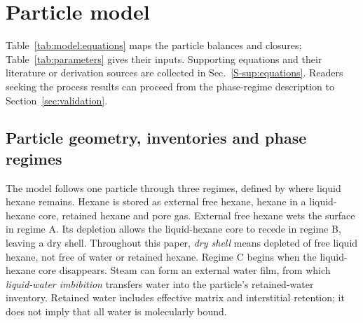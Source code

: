 \section{Particle model}
\label{sec:physical}
\label{sec:model}
\label{sec:thermo}

Table~\ref{tab:model:equations} maps the particle balances and closures;
Table~\ref{tab:parameters} gives their inputs. Supporting equations and
their literature or derivation sources are collected in
Sec.~\ref*{S-sup:equations}. Readers seeking the process results can proceed
from the phase-regime description to Section~\ref{sec:validation}.



\subsection{Particle geometry, inventories and phase regimes}
\label{sec:physical:regimes}
\label{sec:physical:threshold}
\label{sec:physical:inversion}
\label{sec:physical:lewis}

The model follows one particle through three regimes, defined by where
liquid hexane remains. Hexane is stored as external free hexane, hexane in a
liquid-hexane core, retained hexane and pore gas.
External free hexane wets the surface in regime A. Its depletion allows the
liquid-hexane core to recede in regime B, leaving a dry shell. Throughout
this paper, \emph{dry shell} means depleted of free liquid hexane, not free
of water or retained hexane. Regime C begins when the liquid-hexane core
disappears. Steam can form an external water film, from which
\emph{liquid-water imbibition} transfers water into the particle's retained-water
inventory. Retained water includes effective matrix and interstitial
retention; it does not imply that all water is molecularly bound.

